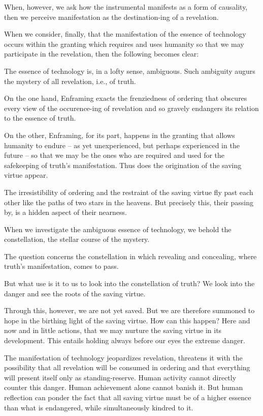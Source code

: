 \documentclass[paper=a4, fontsize=11pt,twoside]{scrartcl}
\begin{document}
When, however, we ask how the instrumental manifests as a form of causality, then we perceive manifestation as the destination-ing of a revelation.

When we consider, finally, that the manifestation of the essence of technology occurs within the granting which requires and uses humanity so that we may participate in the revelation, then the following becomes clear:

The essence of technology is, in a lofty sense, ambiguous. Such ambiguity augurs the mystery of all revelation, i.e., of truth.

On the one hand, Enframing exacts the frenziedness of ordering that obscures every view of the occurence-ing of revelation and so gravely endangers its relation to the essence of truth.

On the other, Enframing, for its part, happens in the granting that allows humanity to endure -- as yet unexperienced, but perhaps experienced in the future -- so that we may be the ones who are required and used for the safekeeping of truth's manifestation. Thus does the origination of the saving virtue appear.

The irresistibility of ordering and the restraint of the saving virtue fly past each other like the paths of two stars in the heavens. But precisely this, their passing by, is a hidden aspect of their nearness.

When we investigate the ambiguous essence of technology, we behold the constellation, the stellar course of the mystery.

The question concerns the constellation in which revealing and concealing, where truth's manifestation, comes to pass.

But what use is it to us to look into the constellation of truth? We look into the danger and see the roots of the saving virtue.

Through this, however, we are not yet saved. But we are therefore summoned to hope in the birthing light of the saving virtue. How can this happen? Here and now and in little actions, that we may nurture the saving virtue in its development. This entails holding always before our eyes the extreme danger.

The manifestation of technology jeopardizes revelation, threatens it with the possibility that all revelation will be consumed in ordering and that everything will present itself only as standing-reserve. Human activity cannot directly counter this danger. Human achievement alone cannot banish it. But human reflection can ponder the fact that all saving virtue must be of a higher essence than what is endangered, while simultaneously kindred to it.
\end{document}
